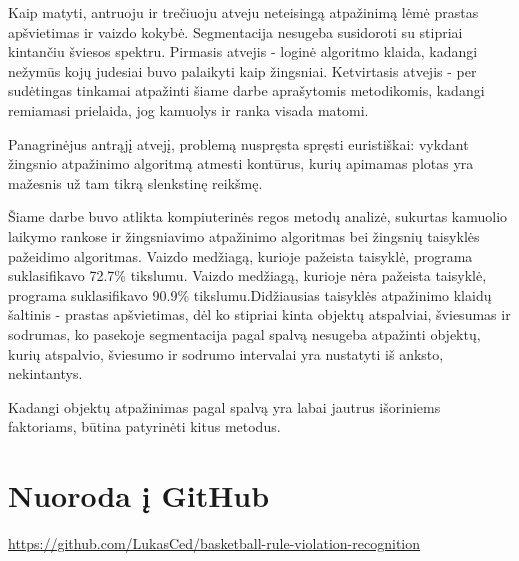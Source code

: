 \documentclass{VUMIFPSkursinis}
\begin{document}
Kaip matyti, antruoju ir trečiuoju atveju neteisingą atpažinimą lėmė prastas apšvietimas ir vaizdo kokybė. Segmentacija nesugeba susidoroti su stipriai kintančiu šviesos spektru. Pirmasis atvejis - loginė algoritmo klaida, kadangi nežymūs kojų judesiai buvo palaikyti kaip žingsniai. Ketvirtasis atvejis - per sudėtingas tinkamai atpažinti šiame darbe aprašytomis metodikomis, kadangi remiamasi prielaida, jog kamuolys ir ranka visada matomi.

Panagrinėjus antrąjį atvejį, problemą nuspręsta spręsti euristiškai: vykdant žingsnio atpažinimo algoritmą atmesti kontūrus, kurių apimamas plotas yra mažesnis už tam tikrą slenkstinę reikšmę. 
 
Šiame darbe buvo atlikta kompiuterinės regos metodų analizė, sukurtas kamuolio laikymo rankose ir žingsniavimo atpažinimo algoritmas bei žingsnių taisyklės pažeidimo algoritmas.
Vaizdo medžiagą, kurioje pažeista taisyklė, programa suklasifikavo 72.7\% tikslumu. Vaizdo medžiagą, kurioje nėra pažeista taisyklė, programa suklasifikavo 90.9\% tikslumu.Didžiausias taisyklės atpažinimo klaidų šaltinis - prastas apšvietimas, dėl ko stipriai kinta objektų atspalviai, šviesumas ir sodrumas, ko pasekoje segmentacija pagal spalvą nesugeba atpažinti objektų, kurių atspalvio, šviesumo ir sodrumo intervalai yra nustatyti iš anksto, nekintantys. 

Kadangi objektų atpažinimas pagal spalvą yra labai jautrus išoriniems faktoriams, būtina patyrinėti kitus metodus.
\printbibliography[heading=bibintoc]  %

\appendix  %
\section{Nuoroda į GitHub}
\url{https://github.com/LukasCed/basketball-rule-violation-recognition}
\end{document}
